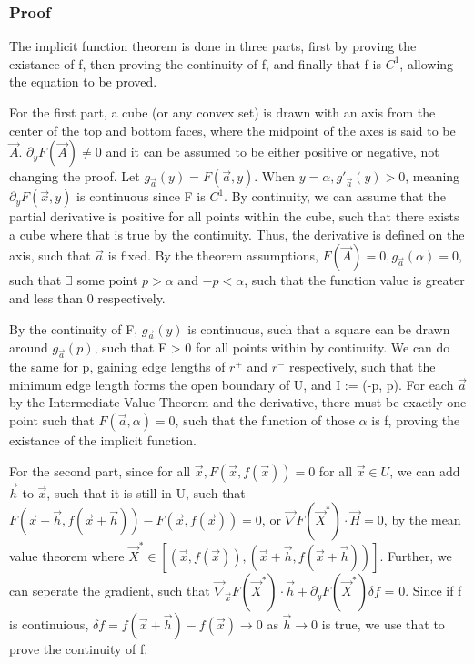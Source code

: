 \documentclass[11 pt, twoside]{article}
\begin{document}
\subsubsection{Proof}
The implicit function theorem is done in three parts, first by proving the existance of f, then proving the continuity of f, and finally that f is $C^1$, allowing the equation to be proved.

For the first part, a cube (or any convex set) is drawn with an axis from the center of the top and bottom faces, where the midpoint of the axes is said to be $\vec{A}$. $\partial_yF(\vec{A}) \neq 0$ and it can be assumed to be either positive or negative, not changing the proof. Let $g_{\vec{a}}(y) = F(\vec{a}, y)$. When $y = \alpha, g'_{\vec{a}}(y) > 0$, meaning $\partial_yF(\vec{x}, y)$ is continuous since F is $C^1$. By continuity, we can assume that the partial derivative is positive for all points within the cube, such that there exists a cube where that is true by the continuity. Thus, the derivative is defined on the axis, such that $\vec{a}$ is fixed. By the theorem assumptions, $F(\vec{A}) = 0, g_{\vec{a}}(\alpha) = 0$, such that $\exists$ some point $p > \alpha$ and $-p < \alpha$, such that the function value is greater and less than 0 respectively.

By the continuity of F, $g_{\vec{a}}(y)$ is continuous, such that a square can be drawn around  $g_{\vec{a}}(p)$, such that F > 0 for all points within by continuity. We can do the same for p, gaining edge lengths of $r^+$ and $r^-$ respectively, such that the minimum edge length forms the open boundary of U, and I := (-p, p). For each $\vec{a}$ by the Intermediate Value Theorem and the derivative, there must be exactly one point such that $F(\vec{a}, \alpha) = 0$, such that the function of those $\alpha$ is f, proving the existance of the implicit function.

For the second part, since for all $\vec{x}, F(\vec{x}, f(\vec{x})) = 0$ for all $\vec{x} \in U$, we can add $\vec{h}$ to $\vec{x}$, such that it is still in U, such that $F(\vec{x}+\vec{h}, f(\vec{x} + \vec{h})) - F(\vec{x}, f(\vec{x})) = 0$, or $\vec{\nabla}F(\vec{X}^*) \cdot \vec{H} = 0$, by the mean value theorem where $\vec{X}^* \in [(\vec{x}, f(\vec{x})), (\vec{x} + \vec{h}, f(\vec{x} + \vec{h}))]$. Further, we can seperate the gradient, such that $\vec{\nabla}_{\vec{x}}F(\vec{X}^*) \cdot \vec{h} + \partial_yF(\vec{X}^*)\delta f$ = 0. Since if f is continuious, $\delta f = f(\vec{x} + \vec{h}) - f(\vec{x}) \to 0$ as $\vec{h} \to 0$ is true, we use that to prove the continuity of f.
\end{document}
